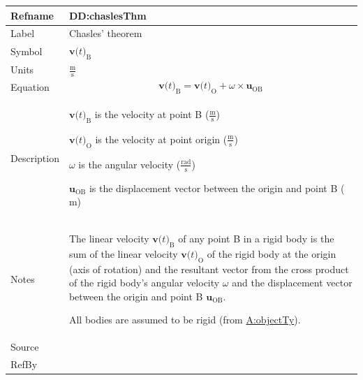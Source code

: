 \documentclass[12pt]{article}
\begin{document}
\medskip
\noindent
\begin{minipage}{\textwidth}
\begin{tabular}{>{\raggedright}p{}>{\raggedright\arraybackslash}p{}}
\toprule \textbf{Refname} & \textbf{DD:chaslesThm}
\label{DD:chaslesThm}
\\ \midrule
Label & Chasles' theorem
        
\\ \midrule
Symbol & ${\symbf{v}\text{(}t\text{)}_{\text{B}}}$
         
\\ \midrule
Units & $\frac{\text{m}}{\text{s}}$
        
\\ \midrule
Equation & \begin{displaymath}
           {\symbf{v}\text{(}t\text{)}_{\text{B}}}={\symbf{v}\text{(}t\text{)}_{\text{O}}}+ω\times{\symbf{u}_{\text{O}\text{B}}}
           \end{displaymath}
\\ \midrule
Description & \begin{symbDescription}
              \item{${\symbf{v}\text{(}t\text{)}_{\text{B}}}$ is the velocity at point B ($\frac{\text{m}}{\text{s}}$)}
              \item{${\symbf{v}\text{(}t\text{)}_{\text{O}}}$ is the velocity at point origin ($\frac{\text{m}}{\text{s}}$)}
              \item{$ω$ is the angular velocity ($\frac{\text{rad}}{\text{s}}$)}
              \item{${\symbf{u}_{\text{O}\text{B}}}$ is the displacement vector between the origin and point B (${\text{m}}$)}
              \end{symbDescription}
\\ \midrule
Notes & The linear velocity ${\symbf{v}\text{(}t\text{)}_{\text{B}}}$ of any point B in a rigid body is the sum of the linear velocity ${\symbf{v}\text{(}t\text{)}_{\text{O}}}$ of the rigid body at the origin (axis of rotation) and the resultant vector from the cross product of the rigid body's angular velocity $ω$ and the displacement vector between the origin and point B ${\symbf{u}_{\text{O}\text{B}}}$.
        
        All bodies are assumed to be rigid (from \hyperref[assumpOT]{A:objectTy}).
        
\\ \midrule
Source & \cite{chaslesWiki}
         
\\ \midrule
RefBy & 
\\ \bottomrule
\end{tabular}
\end{minipage}
\end{document}
